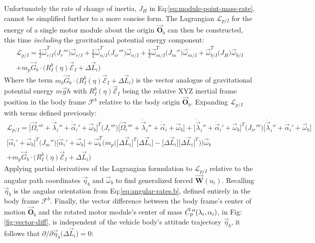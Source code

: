 Unfortunately the rate of change of inertia, $\dot{J}_H$ in Eq:\ref{eq:module-point-mass-rate}, cannot be simplified further to a more concise form. The Lagrangian $\mathcal{L}_{p/I}$ for the energy of a single motor module about the origin $\vec{\mathbf{O}}_b$ can then be constructed, this time \emph{including} the gravitational potential energy component:
\begin{multline}
\mathcal{L}_{p/I}=\frac{1}{2}\vec{\omega}_{r/I}^T\big(J_r'''\big)\vec{\omega}_{r/I}+\frac{1}{2}\vec{\omega}_{n/I}^T\big(J_{ir}'''\big)\vec{\omega}_{n/I}+\frac{1}{2}\vec{\omega}_{m/I}^T\big(J_m''\big)\vec{\omega}_{m/I}+\vec{\omega}_{b/I}^T\big(J_H)\vec{\omega}_{b/I}\\+m_p\vec{G}_b\cdot\big(R_I^b(\eta)\vec{\mathcal{E}}_I+\Delta \vec{L}_i\big)
\end{multline}
Where the term $m_b\vec{G}_b\cdot\big(R_I^b(\eta)\vec{\mathcal{E}}_I+\Delta \vec{L}_i\big)$ is the vector analogue of gravitational potential energy $m\vec{g}h$ with $R_I^b(\eta)\vec{\mathcal{E}}_I$ being the relative XYZ inertial frame position in the body frame $\mathcal{F}^b$ relative to the body origin $\vec{\mathbf{O}}_b$. Expanding $\mathcal{L}_{p/I}$ with terms defined previously:
\begin{multline}
\mathcal{L}_{p/I}=\Big[\vec{\Omega}_i'''+\dot{\vec{\lambda}}_i''+\dot{\vec{\alpha}}_i'+\vec{\omega}_b\Big]^T\big(J_r'''\big)\Big[\vec{\Omega}_i'''+\dot{\vec{\lambda}}_i''+\dot{\vec{\alpha}}_i+\vec{\omega}_b\Big]+\Big[\dot{\vec{\lambda}}_i''+\dot{\vec{\alpha}}_i'+\vec{\omega}_b\Big]^T\big(J_{ir}'''\big)\Big[\dot{\vec{\lambda}}_i''+\dot{\vec{\alpha}}_i'+\vec{\omega}_b\Big]
\\
\Big[\dot{\vec{\alpha}}_i'+\vec{\omega}_b\Big]^T\big(J_m''\big)\Big[\dot{\vec{\alpha}}_i'+\vec{\omega}_b\Big]+\vec{\omega}_{b}^T\big(m_p\Big(\big[\Delta \vec{L}_i\big]^T\big[\Delta \vec{L}_i\big]-\big[\Delta \vec{L}_i\big]\big[\Delta \vec{L}_i\big]^T\Big)\big)\vec{\omega}_{b}
\\
+m_p\vec{G}_b\cdot\big(R_I^b(\eta)\vec{\mathcal{E}}_I+\Delta \vec{L}_i\big)
\end{multline}
Applying partial derivatives of the Lagrangian formulation to $\mathcal{L}_{p/I}$ relative to the angular path coordinates $\vec{\eta}_b$ and $\vec{\omega}_b$ to find generalized forced $\vec{\mathbf{W}}(u_i)$. Recalling $\vec{\eta}_b$ is the angular orientation from Eq:\ref{eq:angular-rates.b}, defined entirely in the body frame $\mathcal{F}^b$. Finally, the vector difference between the body frame's center of motion $\vec{\mathbf{O}}_b$ and the rotated motor module's center of mass $\vec{C}_\text{p}\text{}\hspace{-2pt}''(\lambda_i,\alpha_i)$, in Fig:\ref{fig:vector-diff}, is independent of the vehicle body's attitude trajectory $\vec{\eta}_b$, it follows that $\partial/\partial\vec{\eta}_b\big(\Delta \vec{L}_i\big) = 0$:

